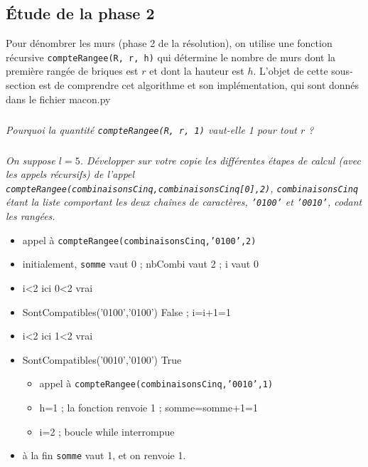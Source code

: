 \subsection*{\'Etude de la phase 2}
\label{ssec:phase2}

Pour dénombrer les murs (phase 2 de la résolution), on utilise une fonction récursive \texttt{compteRangee(R, r, h)}
qui détermine le nombre de murs dont la première rangée de briques est $r$ et dont la hauteur est $h$.
L'objet de cette sous-section est de comprendre cet algorithme et son implémentation, qui sont donnés dans le fichier macon.py%

\subparagraph{}\textit{Pourquoi la quantité \texttt{compteRangee(R, r, 1)} vaut-elle 1 pour tout $r$ ?}



\subparagraph{}\textit{On suppose $l = 5$. Développer sur votre copie les différentes étapes de calcul (avec les
appels récursifs) de l'appel \texttt{compteRangee(combinaisonsCinq,combinaisonsCinq[0],2)}, \texttt{combinaisonsCinq} étant la liste comportant les deux chaînes de caractères, \texttt{'0100'} et \texttt{'0010'}, codant les rangées.
}

\ifprof
\begin{itemize}
\item appel à \texttt{compteRangee(combinaisonsCinq,'0100',2)}
\item initialement, \texttt{somme} vaut 0 ; nbCombi vaut 2 ; i vaut 0
\item i<2 ici 0<2 vrai
\item SontCompatibles('0100','0100') False ; i=i+1=1
\item i<2 ici 1<2 vrai
\item SontCompatibles('0010','0100') True
\begin{itemize}
\item appel à \texttt{compteRangee(combinaisonsCinq,'0010',1)}
\item h=1 ; la fonction renvoie 1 ; somme=somme+1=1
\item i=2 ; boucle while interrompue
\end{itemize}
\item à la fin \texttt{somme} vaut 1, et on renvoie 1.
\end{itemize}
\else
\fi
%
%




